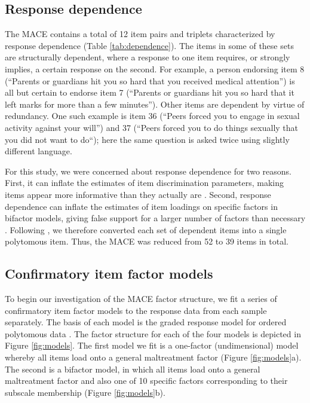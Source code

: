 \documentclass[letterpaper,man,natbib,floatsintext,longtable]{apa6}
\begin{document}
\subsection{Response dependence}

The MACE contains a total of 12 item pairs and triplets characterized by response dependence (Table \ref{tab:dependence}). The items in some of these sets are structurally dependent, where a response to one item requires, or strongly implies, a certain response on the second. For example, a person endorsing item 8 (``Parents or guardians hit you so hard that you received medical attention'') is all but certain to endorse item 7 (``Parents or guardians hit you so hard that it left marks for more than a few minutes''). Other items are dependent by virtue of redundancy. One such example is item 36 (``Peers forced you to engage in sexual activity against your will'') and 37 (``Peers forced you to do things sexually that you did not want to do``); here the same question is asked twice using slightly different language.

For this study, we were concerned about response dependence for two reasons. First, it can inflate the estimates of item discrimination parameters, making items appear more informative than they actually are \citep{marais2008formalizing}. Second, response dependence can inflate the estimates of item loadings on specific factors in bifactor models, giving false support for a larger number of factors than necessary \citep{reise2013applying}. Following \cite{marais2008formalizing}, we therefore converted each set of dependent items into a single polytomous item. Thus, the MACE was reduced from 52 to 39 items in total.

\subsection{Confirmatory item factor models}

To begin our investigation of the MACE factor structure, we fit a series of confirmatory item factor models to the response data from each sample separately. The basis of each model is the graded response model for ordered polytomous data \citep{samejima1997graded}. The factor structure for each of the four models is depicted in Figure \ref{fig:models}. The first model we fit is a one-factor (undimensional) model whereby all items load onto a general maltreatment factor (Figure \ref{fig:models}a). The second is a bifactor model, in which all items load onto a general maltreatment factor and also one of 10 specific factors corresponding to their subscale membership (Figure \ref{fig:models}b). 
\end{document}
